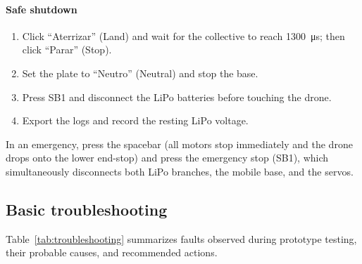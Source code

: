 \paragraph{Safe shutdown}
\begin{enumerate}
  \item Click ``Aterrizar'' (Land) and wait for the collective to reach \SI{1300}{\micro\second}; then click ``Parar'' (Stop).
  \item Set the plate to ``Neutro'' (Neutral) and stop the base.
  \item Press SB1 and disconnect the LiPo batteries before touching the drone.
  \item Export the logs and record the resting LiPo voltage.
\end{enumerate}
In an emergency, press the spacebar (all motors stop immediately and the drone drops onto the lower end-stop) and press the emergency stop (SB1), which simultaneously disconnects both LiPo branches, the mobile base, and the servos.

\subsection{Basic troubleshooting}
\label{sec:troubleshooting}
Table~\ref{tab:troubleshooting} summarizes faults observed during prototype testing, their probable causes, and recommended actions.

